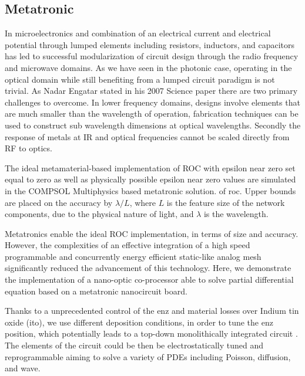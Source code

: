 \subsection{Metatronic}

\par In microelectronics and combination of an electrical current and electrical potential through lumped elements including resistors, inductors, and capacitors has led to successful modularization of circuit design through the radio frequency and microwave domains. As we have seen in the photonic case, operating in the optical domain while still benefiting from a lumped circuit paradigm is not trivial. As Nadar Engatar stated in his 2007 Science paper \cite{N.Engheta_2007} there are two primary challenges to overcome. In lower frequency domains, designs involve elements that are much smaller than the wavelength of operation, fabrication techniques can be used to construct sub wavelength dimensions at optical wavelengths. Secondly the response of metals at IR and optical frequencies cannot be scaled directly from RF to optics.

\par The ideal metamaterial-based implementation of ROC with epsilon near zero set equal to zero as well as physically possible epsilon near zero values are simulated in the \gls{COMPSOL Multiphysics} based metatronic solution. of \acrshort{roc}.  Upper bounds are placed on the accuracy by $\lambda/L$, where $L$ is the feature size of the network components, due to the physical nature of light, and $\lambda$ is the wavelength.  

\par Metatronics enable the ideal ROC implementation, in terms of size and accuracy. However, the complexities of an effective integration of a high speed programmable and concurrently energy efficient static-like analog mesh significantly reduced the advancement of this technology.  Here, we demonstrate the implementation of a nano-optic co-processor able to solve partial differential equation based on a metatronic nanocircuit board. 

\par Thanks to a unprecedented control of the \acrfull{enz} and material losses over \gls{Indium tin oxide} (\acrshort{ito}), we use different deposition conditions, in order to tune the \acrshort{enz} position, which potentially leads to a top-down monolithically integrated circuit \cite{gui2018impact}. The elements of the circuit could be then be electrostatically tuned \cite{amin20180, ma2015indium, alu2018metasurfaces, tahersima2017testbeds} and reprogrammable aiming to solve a variety of PDEs including Poisson, diffusion, and wave. 

